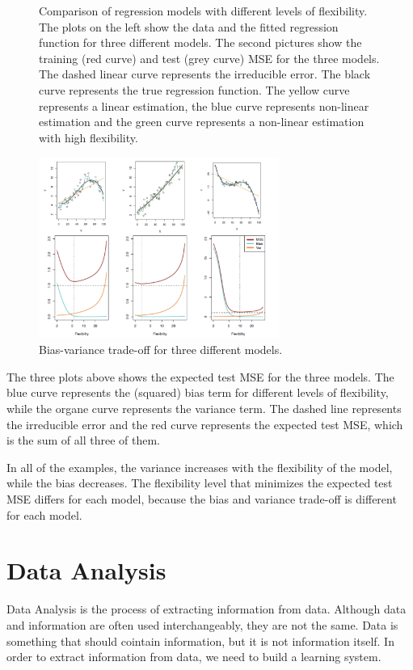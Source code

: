 \begin{figure}
\begin{minipage}[b]{0.7\textwidth}
    \end{minipage}
    \caption{Comparison of regression models with different levels of flexibility. The plots on the left show the data and the fitted regression function for three different models. The second pictures show the training (red curve) and test (grey curve) MSE for the three models. The dashed linear curve represents the irreducible error. The black curve represents the true regression function. The yellow curve represents a linear estimation, the blue curve represents non-linear estimation and the green curve represents a non-linear estimation with high flexibility.}
    \label{fig:flexibilitycomparison}
\end{figure}

\begin{figure}[H]
    \centering
    \includegraphics[width=0.7\textwidth]{./figures/intro/flexibilityexample4.png}
    \caption{Bias-variance trade-off for three different models.}
    \label{fig:flexibilityexample4}
\end{figure}

The three plots above shows the expected test MSE for the three models. The blue curve represents the (squared) bias term for different levels of flexibility, while the organe curve represents the variance term. The dashed line represents the irreducible error and the red curve represents the expected test MSE, which is the sum of all three of them. 

In all of the examples, the variance increases with the flexibility of the model, while the bias decreases. The flexibility level that minimizes the expected test MSE differs for each model, because the bias and variance trade-off is different for each model.

\newpage
\section*{Data Analysis}
Data Analysis is the process of extracting information from data. Although data and information are often used interchangeably, they are not the same. Data is something that should cointain information, but it is not information itself. In order to extract information from data, we need to build a learning system.

